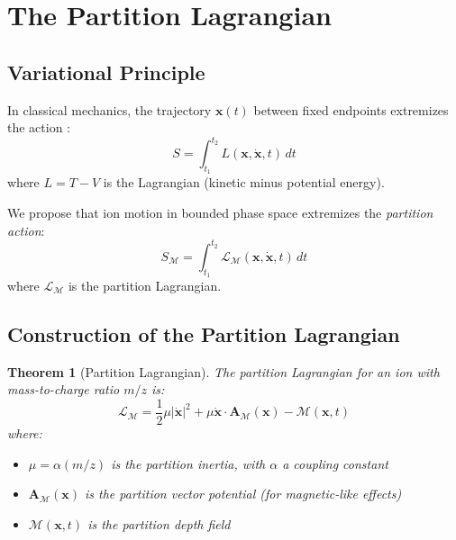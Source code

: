 \documentclass[twocolumn,10pt,a4paper]{article}
\newtheorem{theorem}{Theorem}[section]
\theoremstyle{definition}
\theoremstyle{remark}
\newcommand{\Mdepth}{\mathcal{M}}
\newcommand{\Lagr}{\mathcal{L}}
\newcommand{\Apartition}{\mathbf{A}_{\mathcal{M}}}
\newcommand{\partinert}{\mu}
\begin{document}
\section{The Partition Lagrangian}
\label{sec:lagrangian}

\subsection{Variational Principle}

In classical mechanics, the trajectory $\mathbf{x}(t)$ between fixed endpoints extremizes the action \citep{landau1976}:
\begin{equation}
    S = \int_{t_1}^{t_2} L(\mathbf{x}, \dot{\mathbf{x}}, t) \, dt
    \label{eq:action}
\end{equation}
where $L = T - V$ is the Lagrangian (kinetic minus potential energy).

We propose that ion motion in bounded phase space extremizes the \emph{partition action}:
\begin{equation}
    S_{\Mdepth} = \int_{t_1}^{t_2} \Lagr_{\Mdepth}(\mathbf{x}, \dot{\mathbf{x}}, t) \, dt
    \label{eq:partition_action}
\end{equation}
where $\Lagr_{\Mdepth}$ is the partition Lagrangian.

\subsection{Construction of the Partition Lagrangian}

\begin{theorem}[Partition Lagrangian]
\label{thm:lagrangian}
The partition Lagrangian for an ion with mass-to-charge ratio $m/z$ is:
\begin{equation}
    \boxed{\Lagr_{\Mdepth} = \frac{1}{2}\partinert|\dot{\mathbf{x}}|^2 + \partinert\dot{\mathbf{x}}\cdot\Apartition(\mathbf{x}) - \Mdepth(\mathbf{x}, t)}
    \label{eq:partition_lagrangian}
\end{equation}
where:
\begin{itemize}
    \item $\partinert = \alpha(m/z)$ is the partition inertia, with $\alpha$ a coupling constant
    \item $\Apartition(\mathbf{x})$ is the partition vector potential (for magnetic-like effects)
    \item $\Mdepth(\mathbf{x}, t)$ is the partition depth field
\end{itemize}
\end{theorem}
\end{document}
